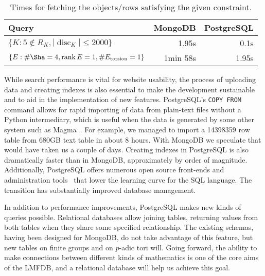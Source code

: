 \documentclass{amsart}
\DeclareMathOperator{\rank}{rank}
\begin{document}
\begin{table}[h!]
  \begin{center}
  \begin{tabular}{l|r|r}
Query & MongoDB & PostgreSQL\\
\hline
$\{K : 5 \notin R_K, |\operatorname{disc}_K| \leq 2000\}$ & 1.95s & 0.1s\\
$\{E : \# \Sha = 4, \rank E = 1, \# E_{\text{torsion}} = 1\}$ & 1min 58s & 1.95s\\
\end{tabular}
\caption{Times for fetching the objects/rows satisfying the given constraint.}
\label{table:indexless}
\end{center}
\end{table}



While search performance is vital for website usability, the process of uploading data and creating indexes is also essential to make the development sustainable and to aid in the implementation of new features.
PostgreSQL's \texttt{COPY FROM} command allows for rapid importing of data from plain-text files without a Python intermediary, which is useful when the data is generated by some other system such as Magma~\cite{magma}.
For example, we managed to import a 14398359 row table from 680GB text table in about 8 hours.
With MongoDB we speculate that would have taken us a couple of days.
Creating indexes in PostgreSQL is also dramatically faster than in MongoDB, approximately by order of magnitude.
Additionally, PostgreSQL offers numerous open source front-ends and administration tools~\cite{pgadmin,adminer} that lower the learning curve for the SQL language.
The transition has substantially improved database management.

In addition to performance improvements, PostgreSQL makes new kinds of queries possible.
Relational databases allow joining tables, returning values from both tables when they share some specified relationship.
The existing schemas, having been designed for MongoDB, do not take advantage of this feature, but new tables on finite groups and on $p$-adic tori will.
Going forward, the ability to make connections between different kinds of mathematics is one of the core aims of the LMFDB, and a relational database will help us achieve this goal.
\end{document}
